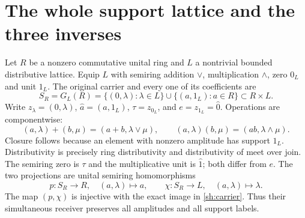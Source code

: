 \section{The whole support lattice and the three inverses}

Let $R$ be a nonzero commutative unital ring and $L$ a nontrivial
bounded distributive lattice.  Equip $L$ with semiring addition
$\vee$, multiplication $\wedge$, zero $0_L$ and unit $1_L$.
The original carrier and every one of its coefficients are
\begin{equation}\tag{SH1}\label{sh:carrier}
 S_R=G_L(R)=\{(0,\lambda):\lambda\in L\}
          \cup\{(a,1_L):a\in R\}\subset R\times L.
\end{equation}
Write $z_\lambda=(0,\lambda)$, $\widehat a=(a,1_L)$,
$\tau=z_{0_L}$, and $e=z_{1_L}=\widehat0$.
Operations are componentwise:
\begin{equation}\tag{SH2}\label{sh:operations}
 (a,\lambda)+(b,\mu)=(a+b,\lambda\vee\mu),\qquad
 (a,\lambda)(b,\mu)=(ab,\lambda\wedge\mu).
\end{equation}
Closure follows because an element with nonzero amplitude has
support $1_L$. Distributivity is precisely ring distributivity and
distributivity of meet over join. The semiring zero is $\tau$ and
the multiplicative unit is $\widehat1$; both differ from $e$.
The two projections are unital semiring homomorphisms
\begin{equation}\tag{SH3}\label{sh:projections}
 p:S_R\to R,\quad(a,\lambda)\mapsto a,\qquad
 \chi:S_R\to L,\quad(a,\lambda)\mapsto\lambda.
\end{equation}
The map $(p,\chi)$ is injective with the exact image in
\eqref{sh:carrier}. Thus their simultaneous receiver preserves all
amplitudes and all support labels.


